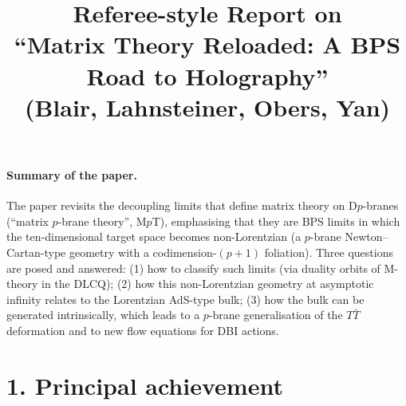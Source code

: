 \documentclass[11pt]{article}
\title{Referee-style Report on\\ ``Matrix Theory Reloaded: A BPS Road to Holography''\\
{\large (Blair, Lahnsteiner, Obers, Yan)}}
\author{}
\date{}
\newcommand{\TT}{T\bar T}
\begin{document}
\maketitle

\paragraph{Summary of the paper.}
The paper revisits the decoupling limits that define matrix theory on D$p$-branes (``matrix $p$-brane theory'', M$p$T), emphasising that they are BPS limits in which the ten-dimensional target space becomes non-Lorentzian (a $p$-brane Newton--Cartan-type geometry with a codimension-$(p+1)$ foliation). Three questions are posed and answered: (1) how to classify such limits (via duality orbits of M-theory in the DLCQ); (2) how this non-Lorentzian geometry at asymptotic infinity relates to the Lorentzian AdS-type bulk; (3) how the bulk can be generated intrinsically, which leads to a $p$-brane generalisation of the $\TT$ deformation and to new flow equations for DBI actions.

\section*{1. Principal achievement}
\end{document}
